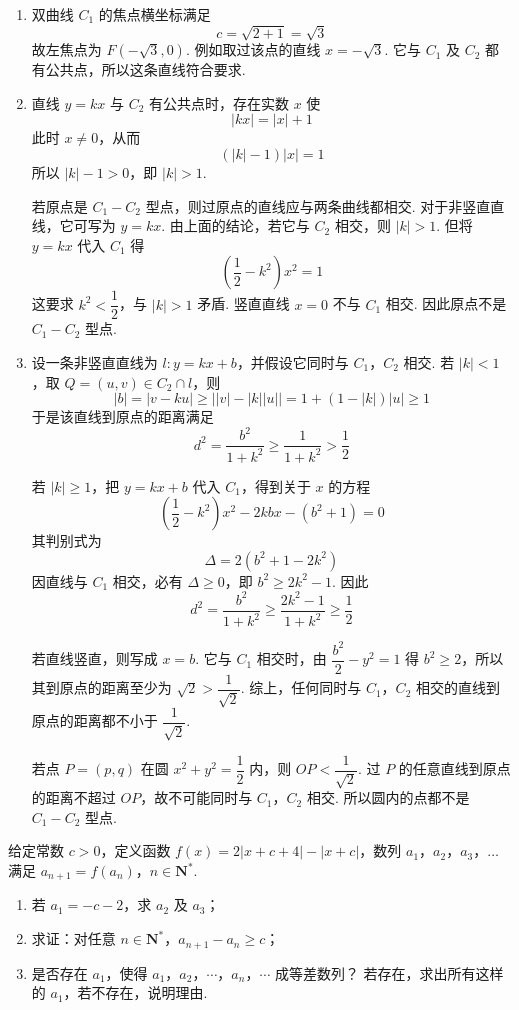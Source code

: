 \begin{solution}
\begin{enumerate}
\item 双曲线 \(C_1\) 的焦点横坐标满足
\[
c=\sqrt{2+1}=\sqrt{3}
\]
故左焦点为 \(F(-\sqrt{3},0)\). 例如取过该点的直线 \(x=-\sqrt{3}\). 它与 \(C_1\) 及 \(C_2\) 都有公共点，所以这条直线符合要求.

\item 直线 \(y=kx\) 与 \(C_2\) 有公共点时，存在实数 \(x\) 使
\[
|kx|=|x|+1
\]
此时 \(x\neq0\)，从而
\[
(|k|-1)|x|=1
\]
所以 \(|k|-1>0\)，即 \(|k|>1\).

若原点是 \(C_1-C_2\) 型点，则过原点的直线应与两条曲线都相交. 对于非竖直直线，它可写为 \(y=kx\). 由上面的结论，若它与 \(C_2\) 相交，则 \(|k|>1\). 但将 \(y=kx\) 代入 \(C_1\) 得
\[
\left(\frac{1}{2}-k^2\right)x^2=1
\]
这要求 \(k^2<\dfrac{1}{2}\)，与 \(|k|>1\) 矛盾. 竖直直线 \(x=0\) 不与 \(C_1\) 相交. 因此原点不是 \(C_1-C_2\) 型点.

\item 设一条非竖直直线为 \(l:y=kx+b\)，并假设它同时与 \(C_1\)，\(C_2\) 相交. 若 \(|k|<1\)，取 \(Q=(u,v)\in C_2\cap l\)，则
\[
|b|=|v-ku|\geqslant\bigl||v|-|k||u|\bigr|=1+(1-|k|)|u|\geqslant1
\]
于是该直线到原点的距离满足
\[
d^2=\frac{b^2}{1+k^2}\geqslant\frac{1}{1+k^2}>\frac{1}{2}
\]

若 \(|k|\geqslant1\)，把 \(y=kx+b\) 代入 \(C_1\)，得到关于 \(x\) 的方程
\[
\left(\frac{1}{2}-k^2\right)x^2-2kbx-(b^2+1)=0
\]
其判别式为
\[
\Delta=2\left(b^2+1-2k^2\right)
\]
因直线与 \(C_1\) 相交，必有 \(\Delta\geqslant0\)，即 \(b^2\geqslant2k^2-1\). 因此
\[
d^2=\frac{b^2}{1+k^2}\geqslant\frac{2k^2-1}{1+k^2}\geqslant\frac{1}{2}
\]

若直线竖直，则写成 \(x=b\). 它与 \(C_1\) 相交时，由 \(\dfrac{b^2}{2}-y^2=1\) 得 \(b^2\geqslant2\)，所以其到原点的距离至少为 \(\sqrt{2}>\dfrac{1}{\sqrt{2}}\). 综上，任何同时与 \(C_1\)，\(C_2\) 相交的直线到原点的距离都不小于 \(\dfrac{1}{\sqrt{2}}\).

若点 \(P=(p,q)\) 在圆 \(x^2+y^2=\dfrac{1}{2}\) 内，则 \(OP<\dfrac{1}{\sqrt{2}}\). 过 \(P\) 的任意直线到原点的距离不超过 \(OP\)，故不可能同时与 \(C_1\)，\(C_2\) 相交. 所以圆内的点都不是 \(C_1-C_2\) 型点.
\end{enumerate}
\end{solution}

\begin{problem}
给定常数 \(c>0\)，定义函数 \(f(x)=2|x+c+4|-|x+c|\)，数列 \(a_1\)，\(a_2\)，\(a_3\)，\(\ldots\) 满足 \(a_{n+1}=f(a_n)\)，\(n\in \mathbf{N}^*\).
\begin{enumerate}
\item 若 \(a_1=-c-2\)，求 \(a_2\) 及 \(a_3\)；
\item 求证：对任意 \(n\in \mathbf{N}^*\)，\(a_{n+1}-a_n\geqslant c\)；
\item 是否存在 \(a_1\)，使得 \(a_1\)，\(a_2\)，\(\cdots\)，\(a_n\)，\(\cdots\) 成等差数列？ 若存在，求出所有这样的 \(a_1\)，若不存在，说明理由.
\end{enumerate}
\end{problem}

